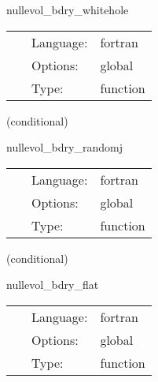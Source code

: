 \hspace{5mm} nullevol\_bdry\_whitehole 

\hspace{5mm}{\it give white hole boundary conditions for the null metric } 


\hspace{5mm}

 \begin{tabular*}{160mm}{cll} 
~ & Language:  & fortran \\ 
~ & Options:  & global \\ 
~ & Type:  & function \\ 
\end{tabular*} 


\vspace{5mm}

   (conditional) 

\hspace{5mm} nullevol\_bdry\_randomj 

\hspace{5mm}{\it give random j boundary conditions for the null metric } 


\hspace{5mm}

 \begin{tabular*}{160mm}{cll} 
~ & Language:  & fortran \\ 
~ & Options:  & global \\ 
~ & Type:  & function \\ 
\end{tabular*} 


\vspace{5mm}

   (conditional) 

\hspace{5mm} nullevol\_bdry\_flat 

\hspace{5mm}{\it give flat boundary conditions for the null metric } 


\hspace{5mm}

 \begin{tabular*}{160mm}{cll} 
~ & Language:  & fortran \\ 
~ & Options:  & global \\ 
~ & Type:  & function \\ 
\end{tabular*} 


\vspace{5mm}

